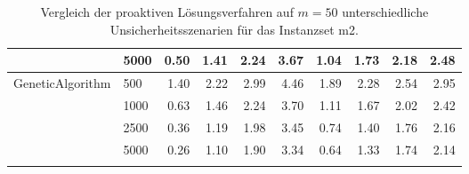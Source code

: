 {\begin{longtable}{ll|rrrr|rrrr}
                 & 5000 & 0.50 & 1.41 & 2.24 & 3.67 & 1.04 & 1.73 & 2.18 & 2.48 \\ \hline
GeneticAlgorithm & 500  & 1.40 & 2.22 & 2.99 & 4.46 & 1.89 & 2.28 & 2.54 & 2.95 \\
                 & 1000 & 0.63 & 1.46 & 2.24 & 3.70 & 1.11 & 1.67 & 2.02 & 2.42 \\
                 & 2500 & 0.36 & 1.19 & 1.98 & 3.45 & 0.74 & 1.40 & 1.76 & 2.16 \\
                 & 5000 & 0.26 & 1.10 & 1.90 & 3.34 & 0.64 & 1.33 & 1.74 & 2.14 \\
\bottomrule
\caption{Vergleich der proaktiven Lösungsverfahren auf $m=50$ unterschiedliche Unsicherheitsszenarien für das Instanzset m2. }
\label{tab:evaluation_proactive_m2}
\end{longtable}
}
\vspace*{-25px}
\begin{figure}[H]
\end{figure}


